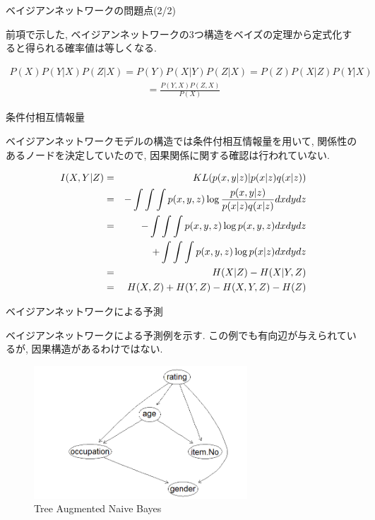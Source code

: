 \documentclass[dvipdfmx]{beamer}
\begin{document}
\begin{frame}{ベイジアンネットワークの問題点(2/2)}

前項で示した, ベイジアンネットワークの3つ構造をベイズの定理から定式化すると得られる確率値は等しくなる. 

\begin{eqnarray}
P(X) P(Y|X) P(Z|X) = P(Y) P(X|Y) P(Z|X) = P(Z) P(X|Z) P(Y|X) \nonumber 
\end{eqnarray} 
\vspace{-1.5zh}
\begin{eqnarray}
= \frac{P(Y, X) P(Z, X)}{P(X)} \nonumber
\end{eqnarray} 


\end{frame}

\begin{frame}{条件付相互情報量}

ベイジアンネットワークモデルの構造では条件付相互情報量を用いて, 関係性のあるノードを決定していたので, 因果関係に関する確認は行われていない. 

\begin{eqnarray}
\label{CMI}
I(X, Y | Z)  &=&  KL(p(x, y| z) | p(x|z) q(x|z)) \nonumber \\
               &=& - \int \int \int p(x, y, z) \log \frac{p(x, y|z)}{p(x|z) q(x|z)} dx dy dz \nonumber \\
               &=& - \int \int \int p(x, y, z) \log p(x, y, z) dx dy dz  \nonumber \\
               & & \hspace{0.5cm} + \int \int \int p(x, y, z) \log p(x| z) dx dy dz  \nonumber \\
               &=& H(X| Z) - H(X| Y, Z) \nonumber \\
               &=& H(X, Z) + H(Y, Z) - H(X, Y, Z) - H(Z)
\end{eqnarray}
\end{frame}

\begin{frame}{ベイジアンネットワークによる予測}

ベイジアンネットワークによる予測例を示す. この例でも有向辺が与えられているが, 因果構造があるわけではない. 

\begin{figure}[H]
\begin{center}
\includegraphics[width=80mm]{data/sample2.png}
\caption{Tree Augmented Naive Bayes}
\label{TAN}
\end{center}
\end{figure}

\end{frame}
\end{document}
